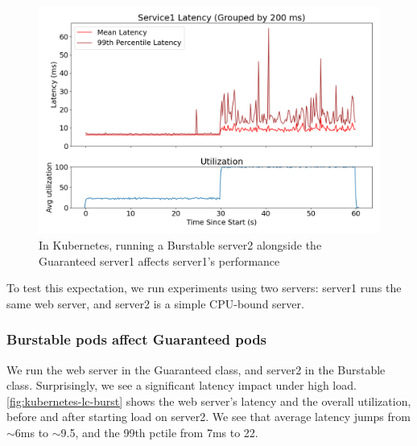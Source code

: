 \begin{figure}[t]
    \centering
    \includegraphics[width=\columnwidth]{graphs/kubernetes-lc-burst.png}
    \caption{In Kubernetes, running a Burstable server2 alongside the Guaranteed
    server1 affects server1's performance}\label{fig:kubernetes-lc-burst}
\end{figure}

To test this expectation, we run experiments using two servers: server1 runs the
same web server, and server2 is a simple CPU-bound server. 

\subsubsection{Burstable pods affect Guaranteed pods}

We run the web server in the Guaranteed class, and server2 in the Burstable
class. Surprisingly, we see a significant latency impact under high load.
\autoref{fig:kubernetes-lc-burst} shows the web server's latency and the overall
utilization, before and after starting load on server2. We see that average
latency jumps from $\sim$6ms to $\sim$9.5, and the 99th pctile from 7ms to 22.

